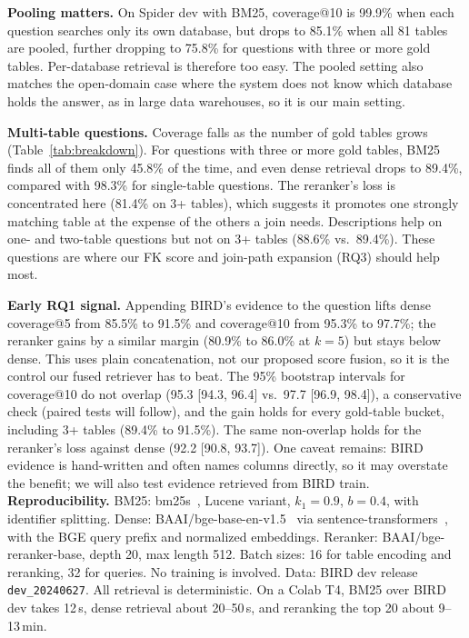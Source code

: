 \documentclass[sigconf,nonacm]{acmart}
\begin{document}
\textbf{Pooling matters.} On Spider dev with BM25, coverage@10 is 99.9\% when each question searches only its own database, but drops to 85.1\% when all 81 tables are pooled, further dropping to 75.8\% for questions with three or more gold tables. Per-database retrieval is therefore too easy. The pooled setting also matches the open-domain case where the system does not know which database holds the answer, as in large data warehouses, so it is our main setting.

\textbf{Multi-table questions.} Coverage falls as the number of gold tables grows (Table~\ref{tab:breakdown}). For questions with three or more gold tables, BM25 finds all of them only 45.8\% of the time, and even dense retrieval drops to 89.4\%, compared with 98.3\% for single-table questions. The reranker's loss is concentrated here (81.4\% on 3+ tables), which suggests it promotes one strongly matching table at the expense of the others a join needs. Descriptions help on one- and two-table questions but not on 3+ tables (88.6\% vs.\ 89.4\%). These questions are where our FK score and join-path expansion (RQ3) should help most.

\textbf{Early RQ1 signal.} Appending BIRD's evidence to the question lifts dense coverage@5 from 85.5\% to 91.5\% and coverage@10 from 95.3\% to 97.7\%; the reranker gains by a similar margin (80.9\% to 86.0\% at $k=5$) but stays below dense. This uses plain concatenation, not our proposed score fusion, so it is the control our fused retriever has to beat. The 95\% bootstrap intervals for coverage@10 do not overlap (95.3 [94.3, 96.4] vs.\ 97.7 [96.9, 98.4]), a conservative check (paired tests will follow), and the gain holds for every gold-table bucket, including 3+ tables (89.4\% to 91.5\%). The same non-overlap holds for the reranker's loss against dense (92.2 [90.8, 93.7]). One caveat remains: BIRD evidence is hand-written and often names columns directly, so it may overstate the benefit; we will also test evidence retrieved from BIRD train.
\textbf{Reproducibility.} BM25: bm25s~\cite{bm25s}, Lucene variant, $k_1=0.9$, $b=0.4$, with identifier splitting. Dense: BAAI/bge-base-en-v1.5~\cite{bge} via sentence-transformers~\cite{sbert}, with the BGE query prefix and normalized embeddings. Reranker: BAAI/bge-reranker-base, depth 20, max length 512. Batch sizes: 16 for table encoding and reranking, 32 for queries. No training is involved. Data: BIRD dev release \texttt{dev\_20240627}. All retrieval is deterministic. On a Colab T4, BM25 over BIRD dev takes 12\,s, dense retrieval about 20--50\,s, and reranking the top 20 about 9--13\,min.
\end{document}
